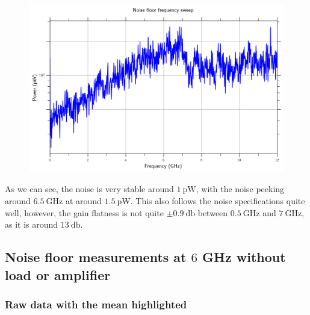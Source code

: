 \documentclass[english,12pt,a4paper]{article}
\begin{document}
\begin{figure}[H]
	\includegraphics[width=1\linewidth]{Plots/noise_floor_sweep}
	\caption[Noise floor frequency sweep]{}
	\label{fig:noisefloorsweep}
\end{figure}

As we can see, the noise is very stable around $\qty{1}{\pico\watt}$, with the noise peeking around $\qty{6.5}{\giga\hertz}$ at around $\qty{1.5}{\pico\watt}$. This also follows the noise specifications quite well, however, the gain flatness is not quite $\pm \qty{0.9}{\decibel}$ between $\qty{0.5}{\giga\hertz}$ and $\qty{7}{\giga\hertz}$, as it is around $\qty{13}{\decibel}$.
 

\hypertarget{noise-floor-measurements-at-6-ghz-without-load-or-amplifier}{%
	\subsection{\texorpdfstring{Noise floor measurements at \(6\) GHz without
			load or
			amplifier}{Noise floor measurements at 6 GHz without load or amplifier}}\label{noise-floor-measurements-at-6-ghz-without-load-or-amplifier}}

 

\hypertarget{raw-data-with-the-mean-highlighted}{%
	\subsubsection{Raw data with the mean
		highlighted}\label{raw-data-with-the-mean-highlighted_1}}
\end{document}
